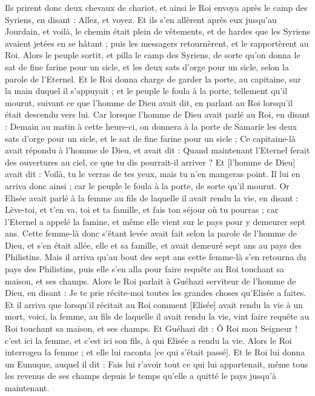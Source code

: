 \begin{multicols}{2}
Ils prirent donc deux chevaux de chariot, et ainsi le Roi envoya après le camp des Syriens, en disant : Allez, et voyez.
Et ils s'en allèrent après eux jusqu'au Jourdain, et voilà, le chemin était plein de vêtements, et de hardes que les Syriens avaient jetées en se hâtant ; puis les messagers retournèrent, et le rapportèrent au Roi.
Alors le peuple sortit, et pilla le camp des Syriens, de sorte qu'on donna le sat de fine farine pour un sicle, et les deux sats d'orge pour un sicle, selon la parole de l'Eternel.
Et le Roi donna charge de garder la porte, au capitaine, sur la main duquel il s'appuyait ; et le peuple le foula à la porte, tellement qu'il mourut, suivant ce que l'homme de Dieu avait dit, en parlant au Roi lorsqu'il était descendu vers lui.
Car lorsque l'homme de Dieu avait parlé au Roi, en disant : Demain au matin à cette heure-ci, on donnera à la porte de Samarie les deux sats d'orge pour un sicle, et le sat de fine farine pour un sicle ;
Ce capitaine-là avait répondu à l'homme de Dieu, et avait dit : Quand maintenant l'Eternel ferait des ouvertures au ciel, ce que tu dis pourrait-il arriver ? Et [l'homme de Dieu] avait dit : Voilà, tu le verras de tes yeux, mais tu n'en mangeras point.
Il lui en arriva donc ainsi ; car le peuple le foula à la porte, de sorte qu'il mourut.
\VerseOne{}Or Elisée avait parlé à la femme au fils de laquelle il avait rendu la vie, en disant : Lève-toi, et t'en va, toi et ta famille, et fais ton séjour où tu pourras ; car l'Eternel a appelé la famine, et même elle vient sur le pays pour y demeurer sept ans.
Cette femme-là donc s'étant levée avait fait selon la parole de l'homme de Dieu, et s'en était allée, elle et sa famille, et avait demeuré sept ans au pays des Philistins.
Mais il arriva qu'au bout des sept ans cette femme-là s'en retourna du pays des Philistins, puis elle s'en alla pour faire requête au Roi touchant sa maison, et ses champs.
Alors le Roi parlait à Guéhazi serviteur de l'homme de Dieu, en disant : Je te prie récite-moi toutes les grandes choses qu'Elisée a faites.
Et il arriva que lorsqu'il récitait au Roi comment [Elisée] avait rendu la vie à un mort, voici, la femme, au fils de laquelle il avait rendu la vie, vint faire requête au Roi touchant sa maison, et ses champs. Et Guéhazi dit : Ô Roi mon Seigneur ! c'est ici la femme, et c'est ici son fils, à qui Elisée a rendu la vie.
Alors le Roi interrogea la femme ; et elle lui raconta [ce qui s'était passé]. Et le Roi lui donna un Eunuque, auquel il dit : Fais lui r'avoir tout ce qui lui appartenait, même tous les revenus de ses champs depuis le temps qu'elle a quitté le pays jusqu'à maintenant.

\end{multicols}

